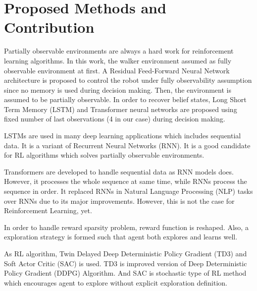 \section{Proposed Methods and Contribution}
\label{sec:proposed_methods}

Partially observable environments are always a hard work for reinforcement learning algorithms. 
In this work, the walker environment assumed as fully observable environment at first. 
A Residual Feed-Forward Neural Network architecture is proposed to control 
the robot under fully observability assumption since no memory is used during decision making. 
Then, the environment is assumed to be partially observable. 
In order to recover belief states, Long Short Term Memory (LSTM) and 
Transformer neural networks are proposed using fixed number of 
last observations (4 in our case) during decision making. 

LSTMs are used in many deep learning applications which includes sequential data. 
It is a variant of Recurrent Neural Networks (RNN). 
It is a good candidate for RL algorithms which solves partially observable environments. 

Transformers are developed to handle sequential data as RNN models does. 
However, it processes the whole sequence at same time, while RNNs process the sequence in order. 
It replaced RNNs in Natural Language Processing (NLP) tasks over RNNs due to its major improvements. 
However, this is not the case for Reinforcement Learning, yet.

In order to handle reward sparsity problem, reward function is reshaped. Also, a exploration strategy is formed such that agent both explores and learns well. 

As RL algorithm, Twin Delayed Deep Deterministic Policy Gradient (TD3) and Soft Actor Critic (SAC) is used. TD3 is improved version of Deep Deterministic Policy Gradient (DDPG) Algorithm. And SAC is stochastic type of RL method which encourages agent to explore without explicit exploration definition.

